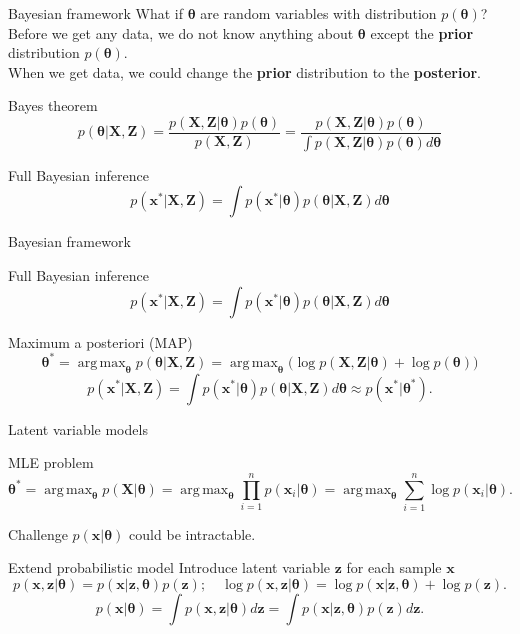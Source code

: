 \documentclass{beamer}
\newcommand{\bx}{\mathbf{x}}
\newcommand{\bz}{\mathbf{z}}
\newcommand{\bX}{\mathbf{X}}
\newcommand{\bZ}{\mathbf{Z}}
\newcommand{\btheta}{\boldsymbol{\theta}}
\DeclareMathOperator*{\argmax}{arg\,max}
\begin{document}
\begin{frame}{Bayesian framework}
    What if $\btheta$ are random variables with distribution $p(\btheta)$? \\
    Before we get any data, we do not know anything about $\btheta$ except the \textbf{prior}  distribution $p(\btheta)$. \\
    When we get data, we could change the \textbf{prior} distribution to the \textbf{posterior}. 
    \begin{block}{Bayes theorem}
    \[
        p(\btheta | \bX, \bZ) = \frac{p(\bX, \bZ | \btheta) p(\btheta)}{p(\bX, \bZ)} = \frac{p(\bX, \bZ | \btheta) p(\btheta)}{\int p(\bX , \bZ | \btheta) p(\btheta) d \btheta} 
    \]
    \end{block}
    \begin{block}{Full Bayesian inference}
    \[
        p(\bx^* | \bX, \bZ) = \int p(\bx^* | \btheta) p(\btheta | \bX, \bZ) d \btheta
    \]
    \end{block}
\end{frame}
\begin{frame}{Bayesian framework}
    \begin{block}{Full Bayesian inference}
    \[
        p(\bx^* | \bX, \bZ) = \int p(\bx^* | \btheta) p(\btheta | \bX, \bZ) d \btheta
    \]
    \end{block}
    \begin{block}{Maximum a posteriori (MAP)}
    \vspace{-0.2cm}
    \[
        \btheta^* = \argmax_{\btheta} p(\btheta | \bX, \bZ) = \argmax_{\btheta} \bigl(\log p(\bX, \bZ | \btheta) + \log p(\btheta) \bigr)
    \]
    \vspace{-0.2cm}
    \[
    p(\bx^* | \bX, \bZ) = \int p(\bx^* | \btheta) p(\btheta | \bX, \bZ) d \btheta \approx p(\bx^* | \btheta^*).
    \]
    \end{block}
\end{frame}
\begin{frame}{Latent variable models}
    \begin{block}{MLE problem}
    \vspace{-0.3cm}
    \[
        \btheta^* = \argmax_{\btheta} p(\bX | \btheta) = \argmax_{\btheta} \prod_{i=1}^n p(\bx_i | \btheta) = \argmax_{\btheta} \sum_{i=1}^n \log p(\bx_i | \btheta).
    \]
    \vspace{-0.3cm}
    \end{block}
    \begin{block}{Challenge}
    $p(\bx | \btheta)$ could be intractable.
    \end{block}
    \begin{block}{Extend probabilistic model}
    Introduce latent variable $\bz$ for each sample $\bx$
    \[
        p(\bx, \bz | \btheta) = p(\bx | \bz, \btheta) p(\bz); \quad 
        \log p(\bx, \bz | \btheta) = \log p(\bx | \bz, \btheta) + \log p(\bz).
    \]
    \[
        p(\bx | \btheta) = \int p(\bx, \bz | \btheta) d\bz = \int p(\bx | \bz, \btheta) p(\bz) d\bz.
    \]
    \end{block}
\end{frame}
\end{document}
